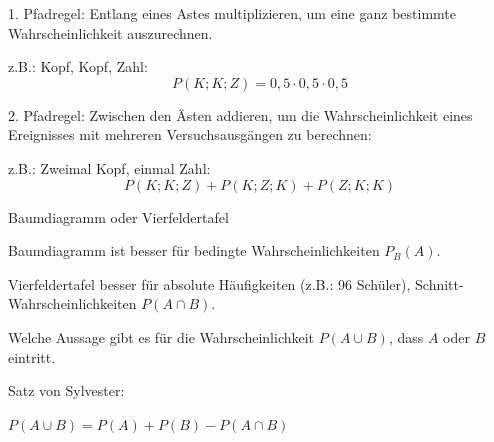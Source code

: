 \documentclass[paper=a6,ngerman,twoside=true,fontsize=14pt, parskip = half]{scrartcl}
\begin{document}
\begin{antwort}

		1. Pfadregel: Entlang eines Astes multiplizieren, um eine ganz bestimmte Wahrscheinlichkeit auszurechnen.
				
		z.B.: Kopf, Kopf, Zahl: \[P(K;K;Z) = 0,5\cdot0,5\cdot0,5\]

		

		2. Pfadregel: Zwischen den Ästen addieren, um die Wahrscheinlichkeit eines Ereignisses mit mehreren Versuchsausgängen zu berechnen:
		
		z.B.: Zweimal Kopf, einmal Zahl: 
			\[P(K;K;Z)+P(K;Z;K)+P(Z;K;K)\]

\end{antwort}
\begin{frage}
	Baumdiagramm oder Vierfeldertafel
\end{frage}
\begin{antwort}
	Baumdiagramm ist besser für bedingte Wahrscheinlichkeiten $P_B(A)$.
		
	Vierfeldertafel besser für
	absolute Häufigkeiten (z.B.: 96 Schüler), 
	Schnitt-Wahrscheinlichkeiten $P(A\cap B).$
\end{antwort}
\begin{frage}
	Welche Aussage gibt es für die 
	Wahrscheinlichkeit $P(A\cup B)$, dass $A$ oder $B$ eintritt.
	
	
\end{frage}
\begin{antwort}
	Satz von Sylvester:
	
	$P(A\cup B)=P(A)+P(B)- P(A\cap B)$
	\bigskip
	
\begin{center}
\end{center}
\end{antwort}
\end{document}
